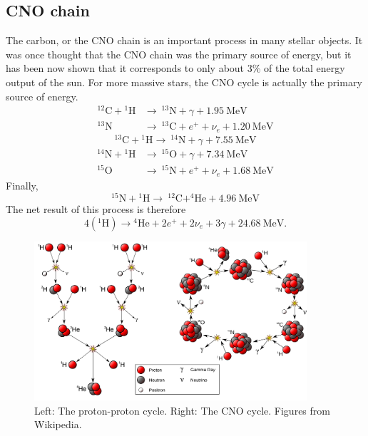 \documentclass[a4paper,12pt]{article}
\theoremstyle{remark}
\newcommand{\mrm}[1]{\mathrm{#1}}
\renewcommand{\=}[1]{\stackrel{#1}{=}} %
\theoremstyle{plain}
\theoremstyle{definition}
\begin{document}
\subsection{CNO chain}
The carbon, or the CNO chain is an important process in many stellar objects. It was once thought that the CNO chain was the primary source of energy, but it has been now shown that it corresponds to only about 3\% of the total energy output of the sun. For more massive stars, the CNO cycle is actually the primary source of energy.
\begin{align}
^{12} \mrm{C} + {}^{1}\mrm{H} & \rightarrow \: ^{13}\mrm{N}+\gamma+1.95 \: \mrm{MeV} \nonumber \\
^{13} \mrm{N} & \rightarrow \: ^{13}\mrm{C} + e^{+} + \nu _e  + 1.20 \: \mrm{MeV}
\end{align}
\begin{equation}
^{13} \mrm{C} + {}^{1}\mrm{H} \rightarrow \: ^{14}\mrm{N} + \gamma + 7.55 \: \mrm{MeV}
\end{equation}
\begin{align}
^{14} \mrm{N} + {}^{1}\mrm{H} & \rightarrow \: ^{15}\mrm{O}+\gamma+7.34 \: \mrm{MeV} \nonumber \\
^{15} \mrm{O} & \rightarrow \: ^{15}\mrm{N} + e^{+} + \nu _e  + 1.68 \: \mrm{MeV}
\end{align}
Finally, 
\begin{equation}
^{15} \mrm{N} + {}^{1}\mrm{H} \rightarrow \: ^{12}\mrm{C} + ^{4}\mrm{He} + 4.96 \: \mrm{MeV}
\end{equation}
The net result of this process is therefore
\begin{equation}
4({}^{1}\mathrm{H}) \rightarrow {}^{4}\mathrm{He} + 2e^{+}+ 2\nu_{e} + 3\gamma + 24.68 \:\mrm{MeV}.
\end{equation}

\begin{figure}[t]
\begin{center}
    \includegraphics*[angle=0,width=0.9\textwidth]{img/fusion_reactions.png}
    \caption[CNO Cycle]{Left: The proton-proton cycle. Right: The CNO cycle. Figures from Wikipedia.\footnotemark}
\label{fig:cno}
\end{center}
\end{figure}
\end{document}
